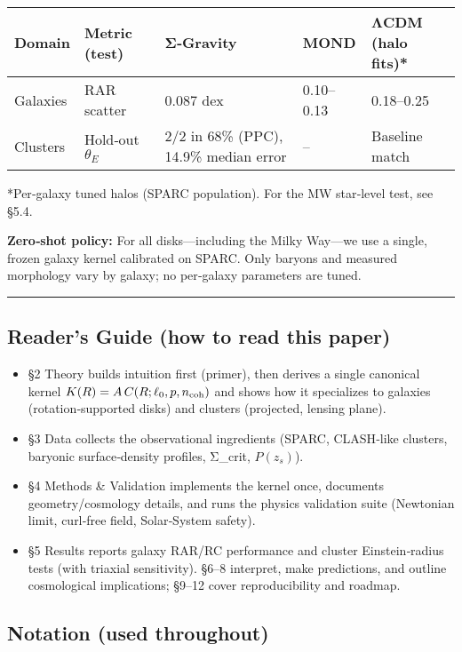 \documentclass[11pt,a4paper]{article}
\begin{document}
\begin{table}[h]
\centering
\begin{tabular}{lllll}
\toprule
Domain & Metric (test) & Σ‑Gravity & MOND & ΛCDM (halo fits)* \\
\midrule
Galaxies & RAR scatter & 0.087 dex & 0.10–0.13 & 0.18–0.25 \\
Clusters & Hold‑out $\theta_E$ & 2/2 in 68\% (PPC), 14.9\% median error & – & Baseline match \\
\bottomrule
\end{tabular}
\end{table}


*Per‑galaxy tuned halos (SPARC population). For the MW star‑level test, see §5.4.


\textbf{Zero‑shot policy:} For all disks—including the Milky Way—we use a single, frozen galaxy kernel calibrated on SPARC. Only baryons and measured morphology vary by galaxy; no per‑galaxy parameters are tuned.


\medskip\hrule\medskip


\subsection{Reader’s Guide (how to read this paper)}


\begin{itemize}
\item §2 Theory builds intuition first (primer), then derives a single canonical kernel $K(R)=A\,C(R;\ell_0,p,n_{\rm coh})$ and shows how it specializes to galaxies (rotation‑supported disks) and clusters (projected, lensing plane).
\item §3 Data collects the observational ingredients (SPARC, CLASH‑like clusters, baryonic surface‑density profiles, Σ\_crit, $P(z_s)$).
\item §4 Methods \& Validation implements the kernel once, documents geometry/cosmology details, and runs the physics validation suite (Newtonian limit, curl‑free field, Solar‑System safety).
\item §5 Results reports galaxy RAR/RC performance and cluster Einstein‑radius tests (with triaxial sensitivity). §6–8 interpret, make predictions, and outline cosmological implications; §9–12 cover reproducibility and roadmap.
\end{itemize}


\subsection{Notation (used throughout)}
\end{document}
